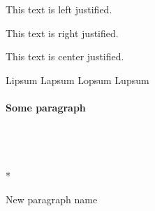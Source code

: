 \documentclass[11pt,a4paper,titlepage,onecolumn]{article}
\begin{document}
%
%
\begin{flushleft}
    This text is left justified.
\end{flushleft}


%
%
\begin{flushright}
    This text is right justified.
\end{flushright}


%
%
\begin{center}
    This text is center justified.
\end{center}


%
%
\setlength{\parindent}{1cm}

%
%
\setlength{\parskip}{1cm plus4mm minus3mm}

%
%
\indent
\noindent

%
%
\hangindent=0.5cm %
Lipsum
\leftskip=0.1cm
Lapsum
\hangafter=0.6cm %
Lopsum
\rightskip=0.2cm
Lupsum
\parfillskip=0.7cm

%
%
\paragraph{Some paragraph} ~\\ %

%
%
~\newline %
~\\ %
~\\* %
~\linebreak[3] %
~\break %
~\hfill\break %
~\par{New paragraph name} %
\end{document}
